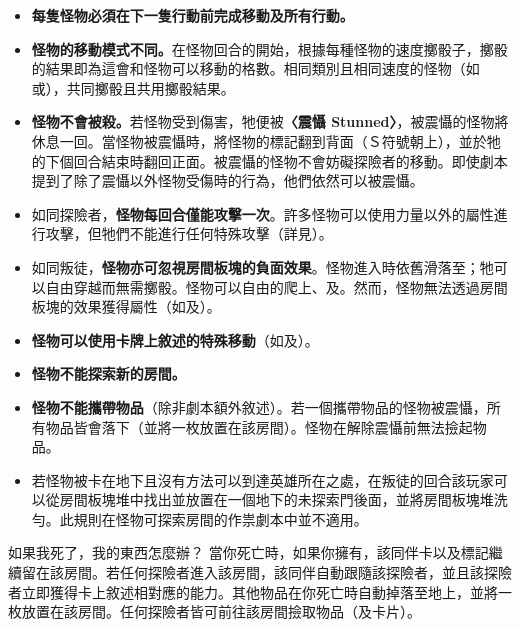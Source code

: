 \begin{itemize}
  \item \textbf{每隻怪物必須在下一隻行動前完成移動及所有行動。}
  \item \textbf{怪物的移動模式不同。}在怪物回合的開始，根據每種怪物的速度擲骰子，擲骰的結果即為這會和怪物可以移動的格數。相同類別且相同速度的怪物（如或），共同擲骰且共用擲骰結果。
  \item \textbf{怪物不會被殺。}若怪物受到傷害，牠便被\textbf{〈震懾 Stunned〉}，被震懾的怪物將休息一回。當怪物被震懾時，將怪物的標記翻到背面（Ｓ符號朝上），並於牠的下個回合結束時翻回正面。被震懾的怪物不會妨礙探險者的移動。即使劇本提到了除了震懾以外怪物受傷時的行為，他們依然可以被震懾。
  \item 如同探險者，\textbf{怪物每回合僅能攻擊一次}。許多怪物可以使用力量以外的屬性進行攻擊，但牠們不能進行任何特殊攻擊（詳見）。
  \item 如同叛徒，\textbf{怪物亦可忽視房間板塊的負面效果}。怪物進入時依舊滑落至；牠可以自由穿越而無需擲骰。怪物可以自由的爬上、及。然而，怪物無法透過房間板塊的效果獲得屬性（如及）。
  \item \textbf{怪物可以使用卡牌上敘述的特殊移動}（如及）。
  \item \textbf{怪物不能探索新的房間。}
  \item \textbf{怪物不能攜帶物品}（除非劇本額外敘述）。若一個攜帶物品的怪物被震懾，所有物品皆會落下（並將一枚放置在該房間）。怪物在解除震懾前無法撿起物品。
  \item 若怪物被卡在地下且沒有方法可以到達英雄所在之處，在叛徒的回合該玩家可以從房間板塊堆中找出並放置在一個地下的未探索門後面，並將房間板塊堆洗勻。此規則在怪物可探索房間的作祟劇本中並不適用。
\end{itemize}

\begin{RuleBox}{如果我死了，我的東西怎麼辦？}
  當你死亡時，如果你擁有，該同伴卡以及標記繼續留在該房間。若任何探險者進入該房間，該同伴自動跟隨該探險者，並且該探險者立即獲得卡上敘述相對應的能力。其他物品在你死亡時自動掉落至地上，並將一枚放置在該房間。任何探險者皆可前往該房間撿取物品（及卡片）。
\end{RuleBox}
